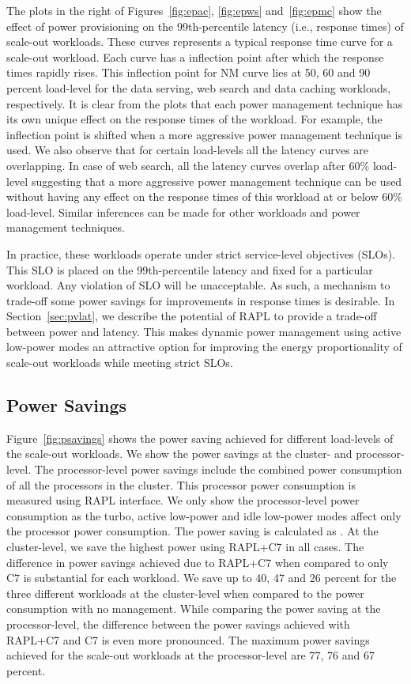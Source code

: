 \documentclass{sig-alternate}
\begin{document}
The plots in the right of Figures~\ref{fig:epac}, \ref{fig:epws} and~\ref{fig:epmc} 
show the effect of power provisioning on the 99th-percentile latency (i.e., response times) 
of scale-out workloads. These curves represents a typical response time curve for a scale-out workload.
Each curve has a inflection point after which the response times 
rapidly rises. This inflection point for NM curve lies at 50, 60 and 90 percent load-level for the 
data serving, web search and data caching workloads, respectively. It is clear from the plots 
that each power management technique has its own unique effect on the response times of the 
workload. For example, the inflection point is shifted when a more aggressive power management 
technique is used. We also observe that for certain load-levels all the latency curves are 
overlapping. In case of web search, all the latency curves overlap after 60\% load-level 
suggesting that a more aggressive power management technique can be used without having 
any effect on the response times of this workload at or below 60\% load-level. Similar 
inferences can be made for other workloads and power management techniques. 

In practice, these workloads operate under strict service-level objectives (SLOs). This SLO is placed
on the 99th-percentile latency and fixed for a particular workload. Any violation of SLO will be 
unacceptable. As such, a mechanism to trade-off some power savings for improvements in response times is 
desirable. In Section~\ref{sec:pvlat}, we describe the potential of RAPL to provide a trade-off 
between power and latency. This makes dynamic power management using active low-power modes 
an attractive option for improving the energy proportionality of scale-out workloads while meeting 
strict SLOs.

\subsection{Power Savings}

Figure~\ref{fig:psavings} shows the power saving achieved for different load-levels of the scale-out workloads. 
We show the power savings at the cluster- and processor-level. The processor-level 
power savings include the combined power consumption of all the processors in the 
cluster. This processor power consumption is measured using RAPL interface. We only show 
the processor-level power consumption as the turbo, active low-power and idle low-power 
modes affect only the processor power consumption. The power 
saving is calculated as . At the 
cluster-level, we save the highest power using RAPL+C7 in all 
cases. The difference in power savings achieved due to RAPL+C7 when compared to only C7 
is substantial for each workload. We save up to 40, 47 and 26 percent 
for the three different workloads at the cluster-level when compared to the 
power consumption with no management. While comparing the power saving at 
the processor-level, the difference between the power savings achieved 
with RAPL+C7 and C7 is even more pronounced. The maximum power savings 
achieved for the scale-out workloads at the processor-level are 77, 76 and 67 
percent. 
\end{document}
